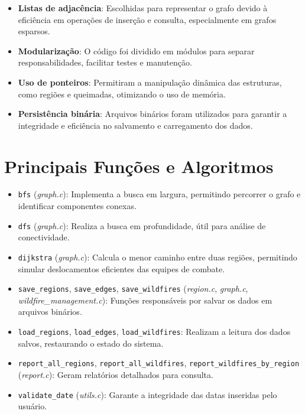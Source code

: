 \documentclass{article}
\begin{document}
\begin{itemize}
    \item \textbf{Listas de adjacência}: Escolhidas para representar o grafo devido à eficiência em operações de inserção e consulta, especialmente em grafos esparsos.
    \item \textbf{Modularização}: O código foi dividido em módulos para separar responsabilidades, facilitar testes e manutenção.
    \item \textbf{Uso de ponteiros}: Permitiram a manipulação dinâmica das estruturas, como regiões e queimadas, otimizando o uso de memória.
    \item \textbf{Persistência binária}: Arquivos binários foram utilizados para garantir a integridade e eficiência no salvamento e carregamento dos dados.
\end{itemize}

\section{Principais Funções e Algoritmos}

\begin{itemize}
    \item \texttt{bfs} (\textit{graph.c}): Implementa a busca em largura, permitindo percorrer o grafo e identificar componentes conexas.
    \item \texttt{dfs} (\textit{graph.c}): Realiza a busca em profundidade, útil para análise de conectividade.
    \item \texttt{dijkstra} (\textit{graph.c}): Calcula o menor caminho entre duas regiões, permitindo simular deslocamentos eficientes das equipes de combate.
    \item \texttt{save\_regions}, \texttt{save\_edges}, \texttt{save\_wildfires} (\textit{region.c}, \textit{graph.c}, \textit{wildfire\_management.c}): Funções responsáveis por salvar os dados em arquivos binários.
    \item \texttt{load\_regions}, \texttt{load\_edges}, \texttt{load\_wildfires}: Realizam a leitura dos dados salvos, restaurando o estado do sistema.
    \item \texttt{report\_all\_regions}, \texttt{report\_all\_wildfires}, \texttt{report\_wildfires\_by\_region} (\textit{report.c}): Geram relatórios detalhados para consulta.
    \item \texttt{validate\_date} (\textit{utils.c}): Garante a integridade das datas inseridas pelo usuário.
\end{itemize}
\end{document}
